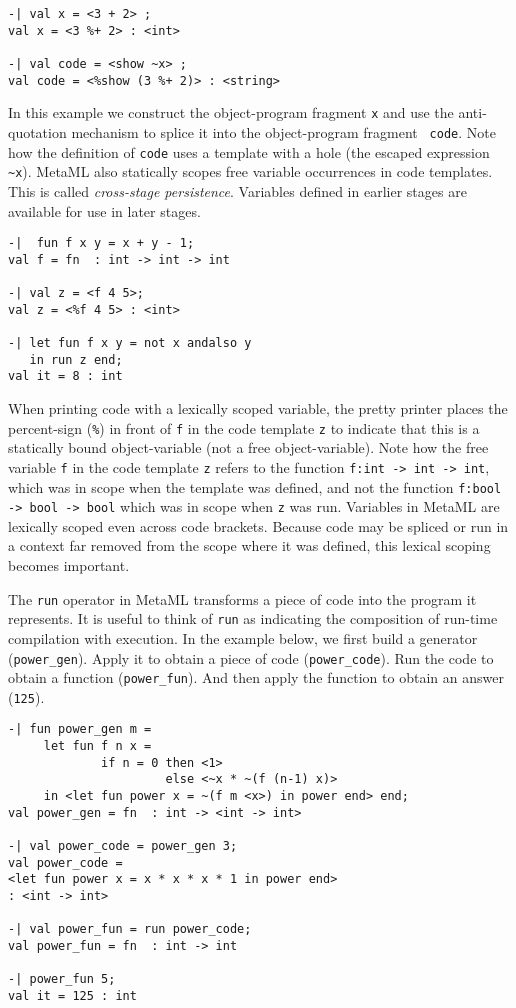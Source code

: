 \documentclass{sigplanconf}
\begin{document}
{\small
\begin{verbatim}
-| val x = <3 + 2> ;
val x = <3 %+ 2> : <int>

-| val code = <show ~x> ;
val code = <%show (3 %+ 2)> : <string>
\end{verbatim}
}

In this example we construct the object-program fragment {\tt x} and use the
anti-quotation mechanism to splice it into the object-program fragment {\tt
code}. Note how the definition of {\tt code} uses a template with a hole (the
escaped expression \verb+~x+). MetaML also statically scopes free variable
occurrences in code templates. This is called {\em cross-stage persistence}.
Variables defined in earlier stages are available for use in later stages.

{\small
\begin{verbatim}
-|  fun f x y = x + y - 1;
val f = fn  : int -> int -> int

-| val z = <f 4 5>;
val z = <%f 4 5> : <int>

-| let fun f x y = not x andalso y 
   in run z end;
val it = 8 : int
\end{verbatim}}

\noindent

When printing code with a lexically scoped variable, the pretty printer places
the percent-sign ({\tt \verb+%+}) in front of {\tt f} in the code template 
{\tt z} to indicate that this is a statically bound object-variable (not a free
object-variable). 
Note how the free variable {\tt f} in the code template {\tt z} refers to
the function {\tt f:int -> int -> int}, which was in scope when the
template was defined, and not the function {\tt f:bool -> bool -> bool}
which was in scope when {\tt z} was run. Variables in MetaML are lexically
scoped even across code brackets. Because code may be spliced or run in a context
far removed from the scope where it was defined, this lexical scoping
becomes important. 

The {\tt run} operator in MetaML transforms a piece of code into the program it
represents. It is useful to think of {\tt run} as indicating the composition of
run-time compilation with execution.  In the example below, we first build a
generator ({\tt power\_gen}). Apply it to obtain a piece of code ({\tt power\_code}).
Run the code to obtain a function ({\tt power\_fun}). And then apply the function to
obtain an answer ({\tt 125}).
{\small
\begin{verbatim}
-| fun power_gen m = 
     let fun f n x = 
             if n = 0 then <1> 
                      else <~x * ~(f (n-1) x)>
     in <let fun power x = ~(f m <x>) in power end> end;
val power_gen = fn  : int -> <int -> int>

-| val power_code = power_gen 3;
val power_code = 
<let fun power x = x * x * x * 1 in power end> 
: <int -> int>

-| val power_fun = run power_code;
val power_fun = fn  : int -> int

-| power_fun 5;
val it = 125 : int
\end{verbatim}}
\end{document}

